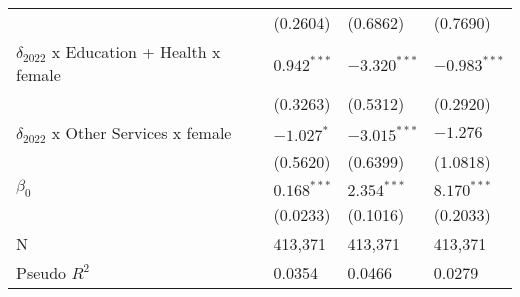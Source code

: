 \begin{tabular}{llll}
                                                   &        (0.2604) &        (0.6862) &        (0.7690) \\
$\delta_{2022}$ x Education + Health x female      &   $0.942^{***}$ &  $-3.320^{***}$ &  $-0.983^{***}$ \\
                                                   &        (0.3263) &        (0.5312) &        (0.2920) \\
$\delta_{2022}$ x Other Services x female          &      $-1.027^*$ &  $-3.015^{***}$ &        $-1.276$ \\
                                                   &        (0.5620) &        (0.6399) &        (1.0818) \\
$\beta_0$                                          &   $0.168^{***}$ &   $2.354^{***}$ &   $8.170^{***}$ \\
                                                   &        (0.0233) &        (0.1016) &        (0.2033) \\
N                                                  &         413,371 &         413,371 &         413,371 \\
Pseudo $R^2$                                       &          0.0354 &          0.0466 &          0.0279 \\
\bottomrule
\end{tabular}
